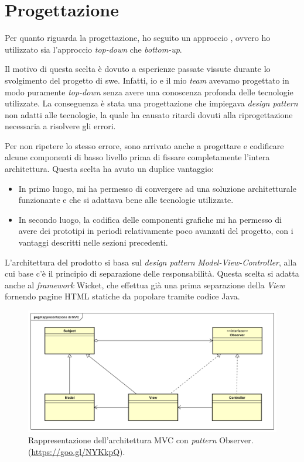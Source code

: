 \section{Progettazione}

	Per quanto riguarda la progettazione, ho seguito un approccio , ovvero ho utilizzato sia l'approccio \textit{top-down} che \textit{bottom-up}.
	
	Il motivo di questa scelta è dovuto a esperienze passate vissute durante lo svolgimento del progetto di \gls{swe}. Infatti, io e il mio \textit{team} avevamo progettato in modo puramente \textit{top-down} senza avere una conoscenza profonda delle tecnologie utilizzate. La conseguenza è stata una progettazione che impiegava \textit{design pattern} non adatti alle tecnologie, la quale ha causato ritardi dovuti alla riprogettazione necessaria a risolvere gli errori.
	
	Per non ripetere lo stesso errore, sono arrivato anche a progettare e codificare alcune componenti di basso livello prima di fissare completamente l'intera architettura. Questa scelta ha avuto un duplice vantaggio:
	\begin{itemize}
		\item In primo luogo, mi ha permesso di convergere ad una soluzione architetturale funzionante e che si adattava bene alle tecnologie utilizzate.
		\item In secondo luogo, la codifica delle componenti grafiche mi ha permesso di avere dei prototipi in periodi relativamente poco avanzati del progetto, con i vantaggi descritti nelle sezioni precedenti.
	\end{itemize}
	
	L'architettura del prodotto si basa sul \textit{design pattern} \textit{Model-View-Controller}, alla cui base c'è il principio di separazione delle responsabilità. Questa scelta si adatta anche al \textit{framework} Wicket, che effettua già una prima separazione della \textit{View} fornendo pagine HTML statiche da popolare tramite codice Java.
	
	\begin{figure}[H]
		\centering
		\includegraphics[width=\textwidth]{immagini/mvc}
		\caption{Rappresentazione dell'architettura MVC con \textit{pattern} Observer. (\url{https://goo.gl/NYKkpQ}).}
	\end{figure}


